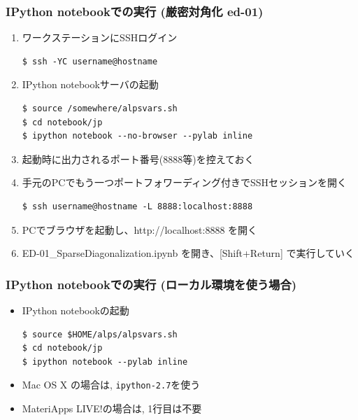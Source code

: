 \begin{frame}[t,fragile,shrink=10]
  \frametitle{IPython notebookでの実行 (厳密対角化 ed-01)}
  \begin{enumerate}
  \item ワークステーションにSSHログイン
\begin{lstlisting}
$ ssh -YC username@hostname
\end{lstlisting}
  \item IPython notebookサーバの起動
\begin{lstlisting}
$ source /somewhere/alpsvars.sh
$ cd notebook/jp
$ ipython notebook --no-browser --pylab inline
\end{lstlisting}
  \item 起動時に出力されるポート番号(8888等)を控えておく
  \item 手元のPCでもう一つポートフォワーディング付きでSSHセッションを開く
\begin{lstlisting}
$ ssh username@hostname -L 8888:localhost:8888
\end{lstlisting}
  \item PCでブラウザを起動し、http://localhost:8888 を開く
  \item ED-01\_SparseDiagonalization.ipynb を開き、[Shift+Return] で実行していく
  \end{enumerate}
\end{frame}

\begin{frame}[t,fragile]
  \frametitle{IPython notebookでの実行 (ローカル環境を使う場合)}
  \begin{itemize}
    \setlength{\itemsep}{1em}
  \item IPython notebookの起動
\begin{lstlisting}
$ source $HOME/alps/alpsvars.sh
$ cd notebook/jp
$ ipython notebook --pylab inline
\end{lstlisting}
  \item Mac OS X の場合は, {\tt ipython-2.7}を使う
  \item MateriApps LIVE!の場合は, 1行目は不要
  \end{itemize}
\end{frame}

